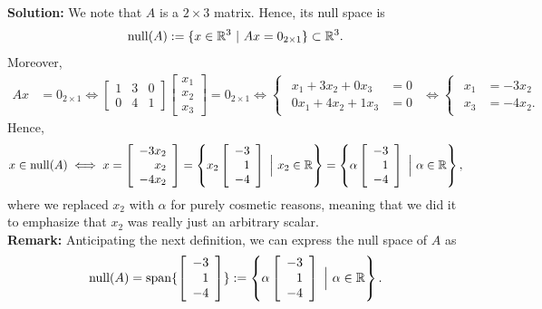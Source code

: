 \textbf{Solution:} We note that $A$ is a $2 \times 3$ matrix. Hence, its null space is $$\mathrm{null}(A):= \{ x \in \mathbb R^3~|~ A x = 0_{2 \times 1} \} \subset \mathbb R^3. $$
Moreover, 
\begin{align*}
  A x &= 0_{2 \times 1} \iff \left[\begin{array}{rrr}1 & 3  & 0 \\ 0 & 4 & 1 \end{array}\right]\left[\begin{array}{r} x_1 \\ x_2 \\ x_3\end{array}\right] = 0_{2 \times 1} \iff \begin{cases}
    \begin{aligned}
     x_1 + 3x_2 + 0 x_3 &=0 \\
     0 x_1 +4x_2 + 1 x_3&= 0
    \end{aligned} \end{cases} \iff \begin{cases}
    \begin{aligned}
     x_1&=-3x_2 \\
     x_3&= -4x_2.
    \end{aligned} \end{cases} 
\end{align*} 
Hence, $$x \in \mathrm{null}(A) \iff  
x = \left[\begin{array}{r} -3x_2 \\ x_2 \\ -4x_2 \end{array}\right] = \left\{  x_2 \left[\begin{array}{r} -3 \\ 1\\ -4 \end{array}\right] ~ \Big| ~ x_2 \in \mathbb R \right\} = \left\{  \alpha \left[\begin{array}{r} -3 \\ 1\\ -4 \end{array}\right] ~ \Big| ~ \alpha \in \mathbb R \right\},$$
where we replaced $x_2$ with $\alpha$ for purely cosmetic reasons, meaning that we did it to emphasize that $x_2$ was really just an arbitrary scalar.
\Qed \\

\textbf{Remark:} Anticipating the next definition, we can express the null space of $A$ as 
$$\text{null}(A) = \mathrm{span} \{ \left[\begin{array}{r} -3 \\ 1 \\ -4 \end{array}\right] \}:=\left\{  \alpha \left[\begin{array}{r} -3 \\ 1\\ -4 \end{array}\right] ~ \Big| ~ \alpha \in \mathbb R \right\}.$$

